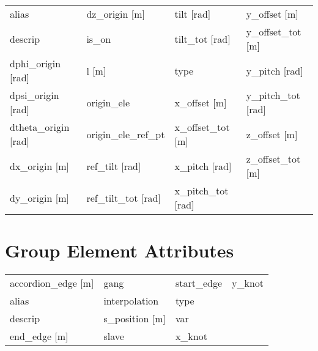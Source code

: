  \begin{tabular}{llll} \toprule
alias                            & dz_origin [m]                    & tilt [rad]                       & y_offset [m]                     \\
descrip                          & is_on                            & tilt_tot [rad]                   & y_offset_tot [m]                 \\
dphi_origin [rad]                & l [m]                            & type                             & y_pitch [rad]                    \\
dpsi_origin [rad]                & origin_ele                       & x_offset [m]                     & y_pitch_tot [rad]                \\
dtheta_origin [rad]              & origin_ele_ref_pt                & x_offset_tot [m]                 & z_offset [m]                     \\
dx_origin [m]                    & ref_tilt [rad]                   & x_pitch [rad]                    & z_offset_tot [m]                 \\
dy_origin [m]                    & ref_tilt_tot [rad]               & x_pitch_tot [rad]                &                                  \\
 \bottomrule
 \end{tabular}
 \vfill
 
 \section{Group Element Attributes}
 \label{s:list.group}
 
 \begin{tabular}{llll} \toprule
accordion_edge [m]               & gang                             & start_edge                       & y_knot                           \\
alias                            & interpolation                    & type                             &                                  \\
descrip                          & s_position [m]                   & var                              &                                  \\
end_edge [m]                     & slave                            & x_knot                           &                                  \\
 \bottomrule
 \end{tabular}
 \vfill
 
